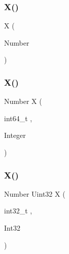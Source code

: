 \subsubsection{X()\hspace{0.1cm}{\footnotesize\ttfamily [1/3]}}
{\footnotesize\ttfamily X (\begin{DoxyParamCaption}\item[{Number}]{ }\end{DoxyParamCaption})}

\mbox{\label{nan__converters__43__inl_8h_a102e58bd65785ff76a2be094d39008b8}} 
\subsubsection{X()\hspace{0.1cm}{\footnotesize\ttfamily [2/3]}}
{\footnotesize\ttfamily Number X (\begin{DoxyParamCaption}\item[{int64\+\_\+t}]{,  }\item[{Integer}]{ }\end{DoxyParamCaption})}

\mbox{\label{nan__converters__43__inl_8h_afcef5f22a5d45bfd912a98c23a49c4fa}} 
\subsubsection{X()\hspace{0.1cm}{\footnotesize\ttfamily [3/3]}}
{\footnotesize\ttfamily Number Uint32 X (\begin{DoxyParamCaption}\item[{int32\+\_\+t}]{,  }\item[{Int32}]{ }\end{DoxyParamCaption})}

